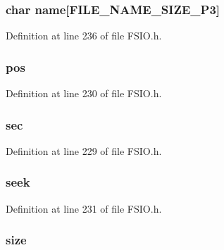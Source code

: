 \subsubsection[{name}]{\setlength{\rightskip}{0pt plus 5cm}char name\mbox{[}{\bf F\+I\+L\+E\+\_\+\+N\+A\+M\+E\+\_\+\+S\+I\+Z\+E\+\_\+P3}\mbox{]}}\label{struct_f_s_f_i_l_e_af7fe269d31112a5ebefb4b54f0493e90}


Definition at line 236 of file F\+S\+I\+O.\+h.

\hypertarget{struct_f_s_f_i_l_e_a334282e8dc9fb36245b63e871c6ed478}{}
\subsubsection[{pos}]{ pos}\label{struct_f_s_f_i_l_e_a334282e8dc9fb36245b63e871c6ed478}


Definition at line 230 of file F\+S\+I\+O.\+h.

\hypertarget{struct_f_s_f_i_l_e_abe78529104154299b4e48cda13345be6}{}
\subsubsection[{sec}]{ sec}\label{struct_f_s_f_i_l_e_abe78529104154299b4e48cda13345be6}


Definition at line 229 of file F\+S\+I\+O.\+h.

\hypertarget{struct_f_s_f_i_l_e_a3452576fc669e5659304fc9a2860d29b}{}
\subsubsection[{seek}]{ seek}\label{struct_f_s_f_i_l_e_a3452576fc669e5659304fc9a2860d29b}


Definition at line 231 of file F\+S\+I\+O.\+h.

\hypertarget{struct_f_s_f_i_l_e_adfdd3a80d1d8ea7918a6d1ebee518102}{}
\subsubsection[{size}]{ size}\label{struct_f_s_f_i_l_e_adfdd3a80d1d8ea7918a6d1ebee518102}


